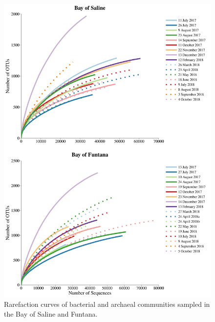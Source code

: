 \documentclass[
  12pt,
]{article}
\begin{document}
\begin{figure}[H]

{\centering \includegraphics[width=0.85\linewidth]{../results/figures/rarefaction} 

}

\caption{Rarefaction curves of bacterial and archaeal communities sampled in the Bay of Saline and Funtana.\label{rarefaction}}\label{fig:unnamed-chunk-1}
\end{figure}
\end{document}
